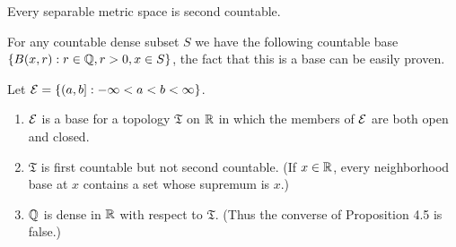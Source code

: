 \documentclass[12pt,a4paper]{article}
\begin{document}
\begin{problem}\label{prob:4-5}
Every separable metric space is second countable.
\end{problem}
\begin{solution}
For any countable dense subset $S$ we have the following countable base $ \qty{B(x,r):r\in\mathbb{Q},r>0,x\in S}$, the fact that this is a base can be easily proven. 
\end{solution}
\begin{problem}\label{prob:4-6}
Let $\mathcal{E} = \{(a,b] : -\infty < a < b < \infty\}$.
\begin{enumerate}[label=\alph*.]
    \item $\mathcal{E}$ is a base for a topology $\mathfrak{T}$ on $\mathbb{R}$ in which the members of $\mathcal{E}$ are both open and closed.
    \item $\mathfrak{T}$ is first countable but not second countable. (If $x \in \mathbb{R}$, every neighborhood base at $x$ contains a set whose supremum is $x$.)
    \item $\mathbb{Q}$ is dense in $\mathbb{R}$ with respect to $\mathfrak{T}$. (Thus the converse of Proposition 4.5 is false.)
\end{enumerate}
\end{problem}
\end{document}
